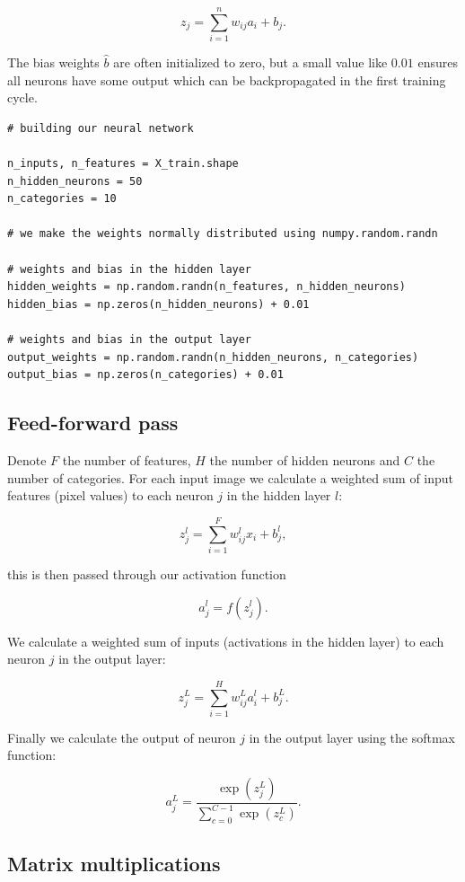 \documentclass[%
oneside,                 %
final,                   %
10pt]{article}
\begin{document}
$$ z_j = \sum_{i=1}^n w_ {ij} a_i + b_j.$$  

The bias weights $\hat{b}$ are often initialized to zero, but a small value like $0.01$ ensures all neurons have some output which can be backpropagated in the first training cycle.
\begin{verbatim}
# building our neural network

n_inputs, n_features = X_train.shape
n_hidden_neurons = 50
n_categories = 10

# we make the weights normally distributed using numpy.random.randn

# weights and bias in the hidden layer
hidden_weights = np.random.randn(n_features, n_hidden_neurons)
hidden_bias = np.zeros(n_hidden_neurons) + 0.01

# weights and bias in the output layer
output_weights = np.random.randn(n_hidden_neurons, n_categories)
output_bias = np.zeros(n_categories) + 0.01
\end{verbatim}

\subsection*{Feed-forward pass}

Denote $F$ the number of features, $H$ the number of hidden neurons and $C$ the number of categories.  
For each input image we calculate a weighted sum of input features (pixel values) to each neuron $j$ in the hidden layer $l$:  

$$ z_{j}^{l} = \sum_{i=1}^{F} w_{ij}^{l} x_i + b_{j}^{l},$$

this is then passed through our activation function  

$$ a_{j}^{l} = f(z_{j}^{l}) .$$  

We calculate a weighted sum of inputs (activations in the hidden layer) to each neuron $j$ in the output layer:  

$$ z_{j}^{L} = \sum_{i=1}^{H} w_{ij}^{L} a_{i}^{l} + b_{j}^{L}.$$  

Finally we calculate the output of neuron $j$ in the output layer using the softmax function:  

$$ a_{j}^{L} = \frac{\exp{(z_j^{L})}}
{\sum_{c=0}^{C-1} \exp{(z_c^{L})}} .$$  

\subsection*{Matrix multiplications}
\end{document}
